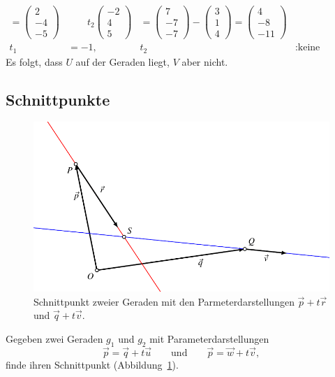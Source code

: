 \begin{beispiel}
\begin{align*}
=
\begin{pmatrix}2\\-4\\-5 \end{pmatrix}
&
\qquad
t_2
\begin{pmatrix}-2\\4\\5\end{pmatrix}
&=
\begin{pmatrix}7\\-7\\-7\end{pmatrix}
-
\begin{pmatrix}3\\1\\4 \end{pmatrix}
=
\begin{pmatrix}4\\-8\\-11\end{pmatrix}
\\
t_1&=-1,&t_2&:\text{keine Lösung.}
\end{align*}
Es folgt, dass $U$ auf der Geraden liegt, $V$ aber nicht.
\end{beispiel}


%
%
\subsection{Schnittpunkte}
\begin{figure}
\centering
\includegraphics{3/images/schnittpunkt.pdf}
\caption{Schnittpunkt zweier Geraden mit den Parmeterdarstellungen
$\vec{p}+t\vec{r}$ und $\vec{q}+t\vec{v}$.
\label{skript:affin:schnittpunkt}}
\end{figure}

\begin{aufgabe}
Gegeben zwei Geraden $g_1$ und $g_2$ mit Parameterdarstellungen
\[
\vec{p} = \vec{q} + t\vec{u}
\qquad\text{und}\qquad
\vec{p} = \vec{w} + t\vec{v},
\]
finde ihren Schnittpunkt (Abbildung~\ref{skript:affin:schnittpunkt}).
\end{aufgabe}


